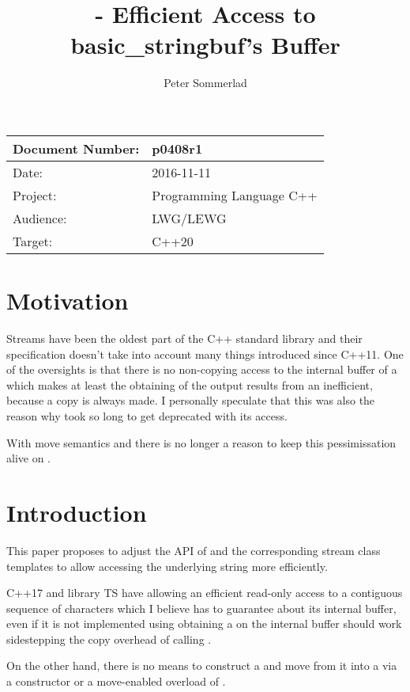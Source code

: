 \documentclass[ebook,11pt,article]{memoir}
\title{\papernumber{} - Efficient Access to basic\_stringbuf's Buffer}
\author{Peter Sommerlad}
\date{\paperdate}                        %
\newcommand{\papernumber}{p0408r1}
\newcommand{\paperdate}{2016-11-11}
\begin{document}
\maketitle
\begin{tabular}[t]{|l|l|}\hline 
Document Number: & \papernumber  \\\hline
Date: & \paperdate \\\hline
Project: & Programming Language C++\\\hline 
Audience: & LWG/LEWG\\\hline
Target: & C++20\\\hline
\end{tabular}

\chapter{Motivation}
Streams have been the oldest part of the C++ standard library and their specification doesn't take into account many things introduced since C++11. One of  the oversights is that there is no non-copying access to the internal buffer of a  which makes at least the obtaining of the output results from an  inefficient, because a copy is always made. I personally speculate that this was also the reason why  took so long to get deprecated with its  access.

With move semantics and  there is no longer a reason to keep this pessimissation alive on .

\chapter{Introduction}
This paper proposes to adjust the API of  and the corresponding stream class templates to allow accessing the underlying string more efficiently.

C++17 and library TS have  allowing an efficient read-only access to a contiguous sequence of characters which I believe  has to guarantee about its internal buffer, even if it is not implemented using  obtaining a  on the internal buffer should work sidestepping the copy overhead of calling . 

On the other hand, there is no means to construct a  and move from it into a  via a constructor or a move-enabled overload of .
\end{document}
